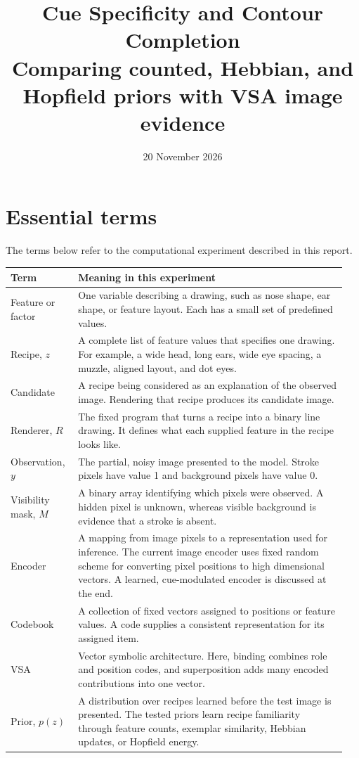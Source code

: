\documentclass[11pt,letterpaper]{article}
\title{Cue Specificity and Contour Completion\\
\large Comparing counted, Hebbian, and Hopfield priors with VSA image evidence}
\author{}
\date{20 November 2026}
\begin{document}
\maketitle
\vspace{-1.5em}

\section{Essential terms}
The terms below refer to the computational experiment described in this report.
\begin{longtable}{@{}p{0.19\linewidth}p{0.76\linewidth}@{}}
\toprule
Term & Meaning in this experiment \\
\midrule
\endhead
Feature or factor & One variable describing a drawing, such as nose shape, ear shape, or feature layout. Each has a small set of predefined values. \\
Recipe, $z$ & A complete list of feature values that specifies one drawing. For example, a wide head, long ears, wide eye spacing, a muzzle, aligned layout, and dot eyes. \\
Candidate & A recipe being considered as an explanation of the observed image. Rendering that recipe produces its candidate image. \\
Renderer, $R$ & The fixed program that turns a recipe into a binary line drawing. It defines what each supplied feature in the recipe looks like. \\
Observation, $y$ & The partial, noisy image presented to the model. Stroke pixels have value 1 and background pixels have value 0. \\
Visibility mask, $M$ & A binary array identifying which pixels were observed. A hidden pixel is unknown, whereas visible background is evidence that a stroke is absent. \\
Encoder & A mapping from image pixels to a representation used for inference. The current image encoder uses fixed random scheme for converting pixel positions to high dimensional vectors. A learned, cue-modulated encoder is discussed at the end. \\
Codebook & A collection of fixed vectors assigned to positions or feature values. A code supplies a consistent representation for its assigned item. \\
VSA & Vector symbolic architecture. Here, binding combines role and position codes, and superposition adds many encoded contributions into one vector. \\
Prior, $p(z)$ & A distribution over recipes learned before the test image is presented. The tested priors learn recipe familiarity through feature counts, exemplar similarity, Hebbian updates, or Hopfield energy. \\

\end{longtable}
\end{document}
